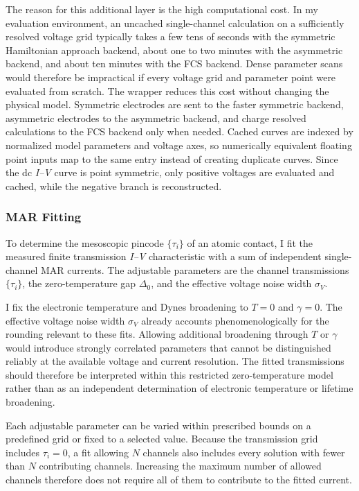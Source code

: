             The reason for this additional layer is the high computational cost. In my evaluation environment, an uncached single-channel calculation on a sufficiently resolved voltage grid typically takes a few tens of seconds with the symmetric Hamiltonian approach backend, about one to two minutes with the asymmetric backend, and about ten minutes with the FCS backend. Dense parameter scans would therefore be impractical if every voltage grid and parameter point were evaluated from scratch. The wrapper reduces this cost without changing the physical model. Symmetric electrodes are sent to the faster symmetric backend, asymmetric electrodes to the asymmetric backend, and charge resolved calculations to the FCS backend only when needed. Cached curves are indexed by normalized model parameters and voltage axes, so numerically equivalent floating point inputs map to the same entry instead of creating duplicate curves. Since the dc \textit{I--V} curve is point symmetric, only positive voltages are evaluated and cached, while the negative branch is reconstructed.

        \subsubsection*{MAR Fitting}

            To determine the mesoscopic pincode $\{\tau_i\}$ of an atomic contact, I fit the measured finite transmission \textit{I--V} characteristic with a sum of independent single-channel MAR currents. The adjustable parameters are the channel transmissions $\{\tau_i\}$, the zero-temperature gap $\Delta_0$, and the effective voltage noise width $\sigma_V$.

            I fix the electronic temperature and Dynes broadening to $T=0$ and $\gamma=0$. The effective voltage noise width $\sigma_V$ already accounts phenomenologically for the rounding relevant to these fits. Allowing additional broadening through $T$ or $\gamma$ would introduce strongly correlated parameters that cannot be distinguished reliably at the available voltage and current resolution. The fitted transmissions should therefore be interpreted within this restricted zero-temperature model rather than as an independent determination of electronic temperature or lifetime broadening.
            
            Each adjustable parameter can be varied within prescribed bounds on a predefined grid or fixed to a selected value. Because the transmission grid includes $\tau_i=0$, a fit allowing $N$ channels also includes every solution with fewer than $N$ contributing channels. Increasing the maximum number of allowed channels therefore does not require all of them to contribute to the fitted current.

